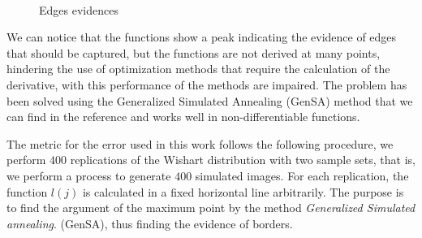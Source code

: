 \documentclass[conference]{IEEEtran}
\begin{document}
\begin{figure}[hbt]
     \hfill
     \\
     \centering
     \caption{Edges evidences}
     \label{fig_02}
   \end{figure}	

We can notice that the functions show a peak indicating the evidence of edges that should be captured, but the functions are not derived at many points, hindering the use of optimization methods that require the calculation of the derivative, with this performance of the methods are impaired. The problem has been solved using the Generalized Simulated Annealing (GenSA) method that we can find in the reference \cite{xgsh} and works well in non-differentiable functions.
    
    The metric for the error used in this work follows the following procedure, we perform $400$ replications of the Wishart distribution with two sample sets, that is, we perform a process to generate $400$ simulated images. For each replication, the function $l(j)$ is calculated in a fixed horizontal line arbitrarily. The purpose is to find the argument of the maximum point by the method {\it Generalized Simulated annealing}. (GenSA), thus finding the evidence of borders.
    
\end{document}
